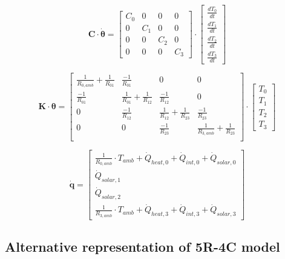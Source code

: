 \begin{equation}
	\mathbf{C} \cdot \boldsymbol{\dot{\theta}} =
	\begin{bmatrix}
		C_{0} & 0 & 0 & 0\\
		0 &  C_{1} & 0 & 0 \\
		0 & 0 & C_{2} & 0\\
		0 & 0 & 0 & C_{3}
	\end{bmatrix}
	\cdot
	\begin{bmatrix}
		\frac{dT_{0}}{dt} \\
		\frac{dT_{1}}{dt} \\
	    \frac{dT_{2}}{dt} \\
	    \frac{dT_{3}}{dt} 
	\end{bmatrix}
\end{equation}

\begin{equation}
	\mathbf{K} \cdot \boldsymbol{\theta} =
	\begin{bmatrix}
		\frac{1}{R_{0, amb}} + \frac{1}{R_{01}} & \frac{-1}{R_{01}} & 0 & 0 \\
		\frac{-1}{R_{01}} &  \frac{1}{R_{01}} + \frac{1}{R_{12}} & \frac{-1}{R_{12}} & 0 \\
		 0 & \frac{-1}{R_{12}} & \frac{1}{R_{12}} + \frac{1}{R_{23}}  & \frac{-1}{R_{23}}\\
	 	 0 & 0 & \frac{-1}{R_{23}} &  \frac{1}{R_{3, amb}} + \frac{1}{R_{23}} \\
	\end{bmatrix}
	\cdot
	\begin{bmatrix}
		T_{0} \\
		T_{1} \\
		T_{2} \\
		T_{3}
	\end{bmatrix}
\end{equation}

\begin{equation}
	\mathbf{\dot{q}} =
	\begin{bmatrix}
		\frac{1}{R_{0, amb}} \cdot T_{amb} + \dot{Q}_{heat, 0} + \dot{Q}_{int, 0} + \dot{Q}_{solar, 0} \\
		\dot{Q}_{solar, 1} \\
		\dot{Q}_{solar, 2} \\
		\frac{1}{R_{3, amb}} \cdot T_{amb} + \dot{Q}_{heat, 3} + \dot{Q}_{int, 3} + \dot{Q}_{solar, 3}
	\end{bmatrix}
\end{equation}

\subsection{Alternative representation of 5R-4C model}

